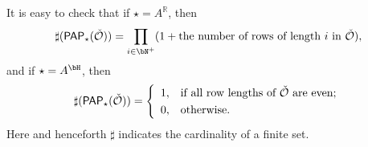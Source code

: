\documentclass[12pt,a4paper]{amsart}
\def\abs#1{\left|{#1}\right|}
\newcommand{\CO}{{\mathcal {O}}}
\newcommand{\sgn}{\operatorname{sgn}}
\newcommand{\R}{\mathbb R}
\def\DDD{{\check\nabla}}
\numberwithin{equation}{section}
\theoremstyle{remark}
\def\half{{\tfrac{1}{2}}}
\def\Irr{\mathrm{Irr}}
\def\ckGc{\check{G}_{\bC}}
\def\YD{\mathsf{YD}}
\def\lamck{\lambda_\ckcO}
\def\PAP{\mathsf{PAP}}
\def\LC{{}^{\scriptscriptstyle L}\sC}
\def\LRC{{}^{\scriptscriptstyle LR}\sC}
\def\AND{\quad \text{and} \quad}
\def\cuprow{{\stackrel{r}{\sqcup}}}
\def\Spr{\mathrm{Springer}}
\def\cuprow{{\,\stackrel{r}{\sqcup}\,}}
\def\DDD{{\check\nabla}}
\begin{document}
It is easy to check that if $\star=A^\R$, then
  \[
    \sharp(\PAP_\star(\check \CO))=\prod_{i\in \bN^+} (1+\textrm{the
      number of rows of length $i$ in $\check \CO$}),
  \]
  and if $\star=A^\bH$, then
  \[
    \sharp(\PAP_\star(\check \CO))= \left\{
      \begin{array}{ll}
        1, &\hbox{if all row lengths of $\check \CO$ are even}; \smallskip\\
        0, &\hbox{otherwise}.  \end{array}
    \right.
  \]
Here and henceforth $\sharp$ indicates the cardinality of a finite set.




%










\end{document}
